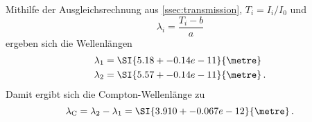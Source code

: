 Mithilfe der Ausgleichsrechnung aus \autoref{ssec:transmission}, $T_i=I_i/I_0$ und
\begin{equation}
    \lambda_i = \frac{T_i - b}{a}
\end{equation}
ergeben sich die Wellenlängen
\begin{align*}
    \lambda_1 &= \SI{5.18+-0.14e-11}{\metre} \\
    \lambda_2 &= \SI{5.57+-0.14e-11}{\metre} \,.
\end{align*}
Damit ergibt sich die Compton-Wellenlänge zu
\begin{equation*}
    \lambda_\text{C} = \lambda_2 - \lambda_1 = \SI{3.910+-0.067e-12}{\metre} \,.
\end{equation*}